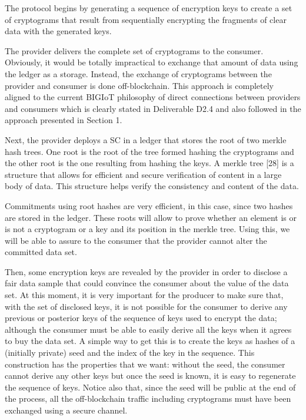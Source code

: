 \documentclass[]{article}
\begin{document}
	The protocol begins by generating a sequence of encryption keys to create a set of cryptograms that result from sequentially encrypting the fragments of clear data with the generated keys.

	The provider delivers the complete set of cryptograms to the consumer. Obviously, it would be totally impractical to exchange that amount of data using the ledger as a storage. Instead, the exchange of cryptograms between the provider and consumer is done off-blockchain. This approach is completely aligned to the current BIGIoT philosophy of direct connections between providers and consumers which is clearly stated in Deliverable D2.4 and also followed in the approach presented in Section 1.

	Next, the provider deploys a SC in a ledger that stores the root of two merkle hash trees. One root is the root of the tree formed hashing the cryptograms and the other root is the one resulting from hashing the keys. A merkle tree [28] is a structure that allows for efficient and secure verification of content in a large body of data. This structure helps verify the consistency and content of the data.

	Commitments using root hashes are very efficient, in this case, since two hashes are stored in the ledger. These roots will allow to prove whether an element is or is not a cryptogram or a key and its position in the merkle tree. Using this, we will be able to assure to the consumer that the provider cannot alter the committed data set.

	Then, some encryption keys are revealed by the provider in order to disclose a fair data sample that could convince the consumer about the value of the data set. At this moment, it is very important for the producer to make sure that, with the set of disclosed keys, it is not possible for the consumer to derive any previous or posterior keys of the sequence of keys used to encrypt the data; although the consumer must be able to easily derive all the keys when it agrees to buy the data set. A simple way to get this is to create the keys as hashes of a (initially private) seed and the index of the key in the sequence. This construction has the properties that we want: without the seed, the consumer cannot derive any other keys but once the seed is known, it is easy to regenerate the sequence of keys. Notice also that, since the seed will be public at the end of the process, all the off-blockchain traffic including cryptograms must have been exchanged using a secure channel.
\end{document}
